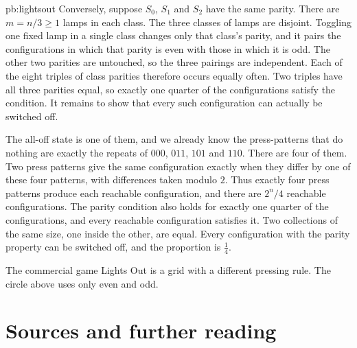 \begin{solution}{pb:lightsout}
Conversely, suppose $S_0$, $S_1$ and $S_2$ have the same parity. There are $m=n/3\ge 1$ lamps in each class. The three classes of lamps are disjoint. Toggling one fixed lamp in a single class changes only that class's parity, and it pairs the configurations in which that parity is even with those in which it is odd. The other two parities are untouched, so the three pairings are independent. Each of the eight triples of class parities therefore occurs equally often. Two triples have all three parities equal, so exactly one quarter of the configurations satisfy the condition. It remains to show that every such configuration can actually be switched off.

The all-off state is one of them, and we already know the press-patterns that do nothing are exactly the repeats of $000$, $011$, $101$ and $110$. There are four of them. Two press patterns give the same configuration exactly when they differ by one of these four patterns, with differences taken modulo $2$. Thus exactly four press patterns produce each reachable configuration, and there are $2^n/4$ reachable configurations. The parity condition also holds for exactly one quarter of the configurations, and every reachable configuration satisfies it. Two collections of the same size, one inside the other, are equal. Every configuration with the parity property can be switched off, and the proportion is $\frac14$.

\leads The commercial game Lights Out is a grid with a different pressing rule. The circle above uses only even and odd.
\end{solution}

\section*{Sources and further reading}

